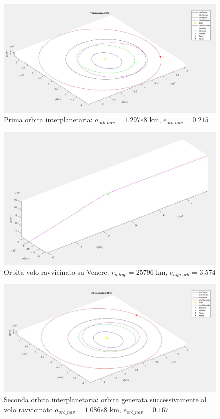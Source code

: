 \documentclass[a4paper]{article}
\begin{document}
\begin{figure}[htbp]
\includegraphics[width=1\textwidth]{Prima_orbita_interplanetaria.png}
\caption{Prima orbita interplanetaria: \newline $a_{orb\_nav} = 1.297e8$ km, $e_{orb\_nav} = 0.215$}
\end{figure}\newline
\begin{figure}[htbp]
\includegraphics[width=1\textwidth]{fly_by.png}
\caption{Orbita volo ravvicinato su Venere: \newline $r_{p\_hyp} = 25796$ km, $e_{hyp\_orb}$ = 3.574}
\end{figure}\newline
\begin{figure}
\includegraphics[width=1\textwidth]{Seconda_orbita_interplanetaria.png}
\caption{Seconda orbita interplanetaria: orbita generata successivamente al volo ravvicinato \newline $a_{orb\_nav} = 1.086e8$ km, $e_{orb\_nav} = 0.167$}
\end{figure}\newline
\end{document}
